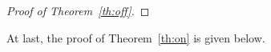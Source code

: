 \documentclass{article}
\theoremstyle{plain}
\theoremstyle{definition}
\theoremstyle{remark}
\begin{document}
\begin{proof}[Proof of Theorem~\ref{th:off}]
\end{proof}
At last, the proof of Theorem~\ref{th:on} is given below.
\end{document}
